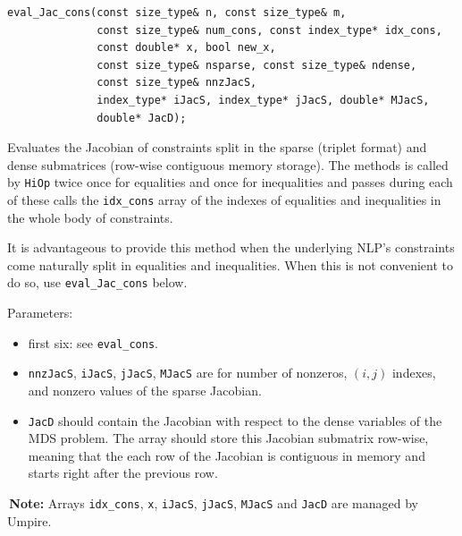 \documentclass[11pt]{article}
\newcommand{\warningSymbol}{\raisebox{0.9\depth}{\danger}}
\newcommand{\warningcp}[1]{%
        \smallskip \noindent \textcolor{warningColorText}{\warningSymbol{}}\,\textbf{#1} %
    }
\newcommand{\Hi}{\texttt{HiOp}\xspace}
\begin{document}
\begin{lstlisting} 
eval_Jac_cons(const size_type& n, const size_type& m, 
              const size_type& num_cons, const index_type* idx_cons,
              const double* x, bool new_x,
              const size_type& nsparse, const size_type& ndense,
              const size_type& nnzJacS,
              index_type* iJacS, index_type* jJacS, double* MJacS, 
              double* JacD);
\end{lstlisting} 


Evaluates the Jacobian of constraints split in the sparse (triplet format) and dense submatrices (row-wise contiguous memory storage). The methods is called by \Hi twice once for equalities and once for inequalities and passes during each of these calls  the \texttt{idx\_cons} array of the indexes of equalities and inequalities in the whole body of constraints.

It is advantageous to provide
this method when the underlying NLP's constraints come naturally split in equalities
and inequalities. When this is not convenient to do so, use \texttt{eval\_Jac\_cons} below.

Parameters:
\begin{itemize} 
\item first six: see \texttt{eval\_cons}.
\item \texttt{nnzJacS}, \texttt{iJacS}, \texttt{jJacS}, \texttt{MJacS} are for number of nonzeros, $(i,j)$ indexes, and nonzero values of   the sparse Jacobian.
\item \texttt{JacD} should contain the Jacobian with respect to the dense variables of the MDS problem. The array should store this Jacobian submatrix row-wise, meaning that the each row of the Jacobian is contiguous in memory and starts right after the previous row.
\end{itemize}

\warningcp{Note:} Arrays \texttt{idx\_cons}, \texttt{x}, \texttt{iJacS}, \texttt{jJacS}, \texttt{MJacS} and \texttt{JacD} are managed by Umpire.
\end{document}
